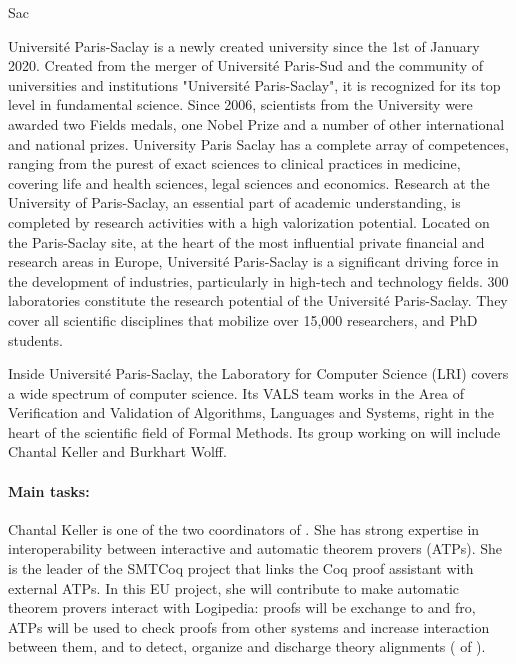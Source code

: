 \begin{sitedescription}{Sac}


Université Paris-Saclay is a newly created university since the 1st of
January 2020. Created from the merger of Université Paris-Sud and the
community of universities and institutions "Université Paris-Saclay", it
is recognized for its top level in fundamental science.  Since 2006,
scientists from the University were awarded two Fields medals, one Nobel
Prize and a number of other international and national prizes.
University Paris Saclay has a complete array of competences, ranging
from the purest of exact sciences to clinical practices in medicine,
covering life and health sciences, legal sciences and economics.
Research at the University of Paris-Saclay, an essential part of
academic understanding, is completed by research activities with a high
valorization potential. Located on the Paris-Saclay site, at the heart
of the most influential private financial and research areas in Europe,
Université Paris-Saclay is a significant driving force in the
development of industries, particularly in high-tech and technology
fields. 300 laboratories constitute the research potential of the
Université Paris-Saclay. They cover all scientific disciplines that
mobilize over 15,000 researchers, and PhD students.

Inside Université Paris-Saclay, the Laboratory for Computer Science
(LRI) covers a wide spectrum of computer science. Its VALS team works in
the Area of Verification and Validation of Algorithms, Languages and
Systems, right in the heart of the scientific field of Formal Methods.
Its group working on \pn will include Chantal Keller and Burkhart Wolff.

\paragraph*{Main tasks:}

Chantal Keller is one of the two coordinators of . She has
strong expertise in interoperability between interactive and automatic
theorem provers (ATPs). She is the leader of the SMTCoq project that
links the Coq proof assistant with external ATPs. In this EU project,
she will contribute to make automatic theorem provers interact with
Logipedia: proofs will be exchange to and fro, ATPs will be used to
check proofs from other systems and increase interaction between them,
and to detect, organize and discharge theory alignments
( of ).


\end{sitedescription}
